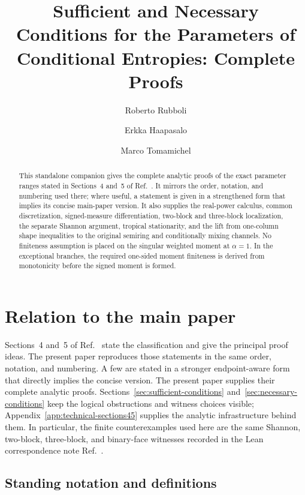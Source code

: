 \documentclass[aps,pra,11pt,onecolumn,nofootinbib,tightenlines]{revtex4-2}
\theoremstyle{definition}
\begin{document}
\title{Sufficient and Necessary Conditions for the Parameters of Conditional Entropies: Complete Proofs}

\begin{abstract}
This standalone companion gives the complete analytic proofs of the exact
parameter ranges stated in Sections~4 and~5 of
Ref.~\cite{rubboli2026complete}. It mirrors the order, notation, and numbering
used there; where useful, a statement is given in a strengthened form that
implies its concise main-paper version. It also supplies the real-power
calculus, common discretization, signed-measure differentiation, two-block and
three-block localization, the separate Shannon argument, tropical stationarity,
and the lift from one-column shape inequalities to the original semiring and
conditionally mixing channels. No finiteness assumption is placed on the
singular weighted moment at $\alpha=1$. In the exceptional branches, the required one-sided moment
finiteness is derived from monotonicity before the signed moment is formed.
\end{abstract}

\author{Roberto Rubboli}
\noaffiliation
\author{Erkka Haapasalo}
\noaffiliation
\author{Marco Tomamichel}
\noaffiliation

\maketitle
\tableofcontents

\section*{Relation to the main paper}

Sections~4 and~5 of Ref.~\cite{rubboli2026complete} state the classification
and give the principal proof ideas.  The present paper reproduces those
statements in the same order, notation, and numbering.  A few are stated in a
stronger endpoint-aware form that directly implies the concise version.  The
present paper supplies their complete analytic proofs.
Sections~\ref{sec:sufficient-conditions}
and~\ref{sec:necessary-conditions} keep the logical obstructions and witness
choices visible; Appendix~\ref{app:technical-sections45} supplies the analytic
infrastructure behind them.  In particular, the finite counterexamples used
here are the same Shannon, two-block, three-block, and binary-face witnesses
recorded in the Lean correspondence note
Ref.~\cite{rubboli2026parametersLean}.

\subsection*{Standing notation and definitions}
\end{document}
